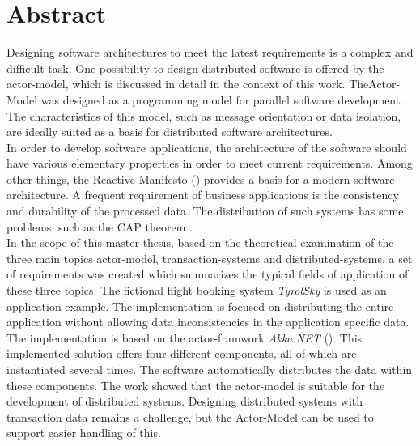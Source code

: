 
\chapter*{Abstract}
Designing software architectures to meet the latest requirements is a complex and difficult task. One possibility to design distributed software is offered by the actor-model, which is discussed in detail in the context of this work. TheActor-Model was designed as a programming model for parallel software development \citep{hewitt1973session}. The characteristics of this model, such as message orientation or data isolation, are ideally suited as a basis for distributed software architectures. \\
In order to develop software applications, the architecture of the software should have various elementary properties in order to meet current requirements. Among other things, the Reactive Manifesto (\cite{reactiveManifesto}) provides a basis for a modern software architecture. 
A frequent requirement of business applications is the consistency and durability of the processed data. The distribution of such systems has some problems, such as the CAP theorem \citep{gilbertPerspectiveCAPTheorem2012}. \\
In the scope of this master thesis, based on the theoretical examination of the three main topics actor-model, transaction-systems and distributed-systems, a set of requirements was created which summarizes the typical fields of application of these three topics. The fictional flight booking system \textit{TyrolSky} is used as an application example. The implementation is focused on distributing the entire application without allowing data inconsistencies in the application specific data. \\
The implementation is based on the actor-framwork \textit{Akka.NET} (\cite{Akka.NETCommunityAkka.NETDocumentation}). This implemented solution offers four different components, all of which are instantiated several times. The software automatically distributes the data within these components.
The work showed that the actor-model is suitable for the development of distributed systems. Designing distributed systems with transaction data remains a challenge, but the Actor-Model can be used to support easier handling of this.


\cleardoublepage
{} %